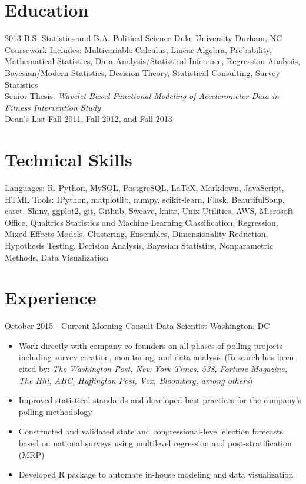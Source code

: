 \documentclass[10pt,a4paper,sans]{moderncv}        %
\begin{document}
\makecvtitle\vspace{-6ex}                          %

\section{Education} 
\cventry
	{2013}
	{B.S. Statistics and B.A. Political Science}
	{Duke University}
	{Durham, NC}
	{}
	{Coursework Includes: Multivariable Calculus, Linear Algebra, Probability, Mathematical Statistics, 
	Data Analysis/Statistical Inference, Regression Analysis, Bayesian/Modern Statistics, Decision Theory,
	Statistical Consulting, Survey Statistics
	\\Senior Thesis: \textit{Wavelet-Based Functional Modeling of Accelerometer Data in Fitness Intervention Study}
	\\Dean's List Fall 2011, Fall 2012, and Fall 2013} 

\section{Technical Skills}
\cvitem
  {Languages:}
  {R, Python, MySQL, PostgreSQL, \LaTeX, Markdown, JavaScript, HTML}
\cvitem
  {Tools:}
  {IPython, matplotlib, numpy, scikit-learn, Flask, BeautifulSoup, caret, Shiny, ggplot2, git, Github, Sweave, knitr, Unix Utilities, AWS,
  Microsoft Office, Qualtrics}
\cvitem
  {Statistics and Machine Learning:}{Classification, Regression, Mixed-Effects Models, Clustering, Ensembles, Dimensionality Reduction,
  Hypothesis Testing, Decision Analysis, Bayesian Statistics, Nonparametric Methods, Data Visualization}

\section{Experience}
\cventry
  {October 2015 - Current}
  {Morning Consult Data Scientist}
  {}
  {Washington, DC}
  {}
  {
    \begin{itemize}
      \item{Work directly with company co-founders on all phases of polling projects including survey creation, monitoring, and data analysis
      (Research has been cited by: \textit{The Washington Post, New York Times, 538, Fortune Magazine, The Hill, ABC, Huffington Post, Vox, Bloomberg, among others})}
      \item{Improved statistical standards and developed best practices for the company’s polling methodology}
      \item{Constructed and validated state and congressional-level election forecasts based on national surveys using multilevel regression 
      and post-stratification (MRP)}
      \item{Developed R package to automate in-house modeling and data visualization}
    \end{itemize}
  }
  
\end{document}
